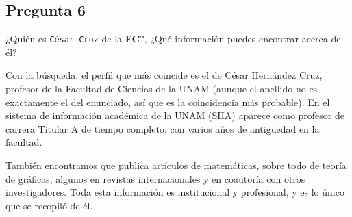 \subsection{Pregunta 6}

¿Quién es \texttt{César Cruz} de la \textbf{FC}?, ¿Qué información puedes encontrar acerca de él?

\begin{respuesta}
    Con la búsqueda, el perfil que más coincide es el de César Hernández Cruz, profesor
    de la Facultad de Ciencias de la UNAM (aunque el apellido no es exactamente el
    del enunciado, así que es la coincidencia más probable). En el sistema de información
    académica de la UNAM (SIIA) aparece como profesor de carrera Titular A de tiempo
    completo, con varios años de antigüedad en la facultad.

    También encontramos que publica artículos de matemáticas, sobre todo de teoría de
    gráficas, algunos en revistas internacionales y en coautoría con otros investigadores.
    Toda esta información es institucional y profesional, y es lo único que se
    recopiló de él.
\end{respuesta}
